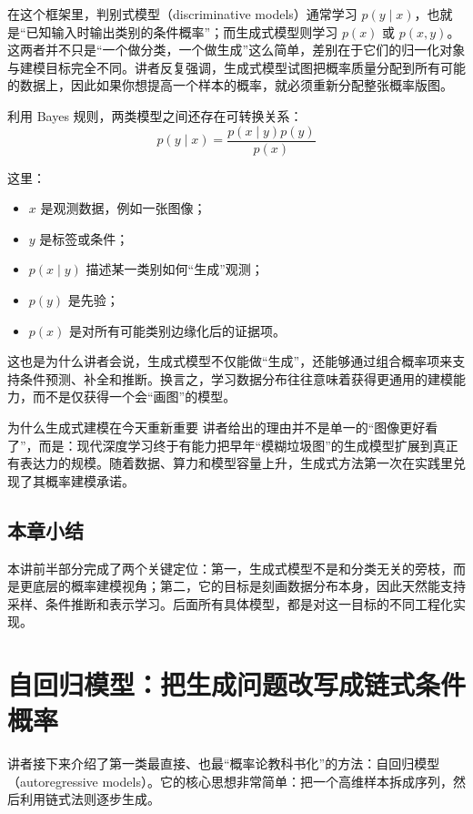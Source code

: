 \documentclass[a4paper]{article}
\begin{document}
    在这个框架里，判别式模型（discriminative models）通常学习 $p(y \mid x)$，也就是“已知输入时输出类别的条件概率”；而生成式模型则学习 $p(x)$ 或 $p(x, y)$。这两者并不只是“一个做分类，一个做生成”这么简单，差别在于它们的归一化对象与建模目标完全不同。讲者反复强调，生成式模型试图把概率质量分配到所有可能的数据上，因此如果你想提高一个样本的概率，就必须重新分配整张概率版图。

    利用 Bayes 规则，两类模型之间还存在可转换关系：
    \[
    p(y \mid x)=\frac{p(x \mid y)p(y)}{p(x)}
    \]

    这里：
    \begin{itemize}
    \item $x$ 是观测数据，例如一张图像；
    \item $y$ 是标签或条件；
    \item $p(x \mid y)$ 描述某一类别如何“生成”观测；
    \item $p(y)$ 是先验；
    \item $p(x)$ 是对所有可能类别边缘化后的证据项。
    \end{itemize}

    这也是为什么讲者会说，生成式模型不仅能做“生成”，还能够通过组合概率项来支持条件预测、补全和推断。换言之，学习数据分布往往意味着获得更通用的建模能力，而不是仅获得一个会“画图”的模型。

    \begin{importantbox}{为什么生成式建模在今天重新重要}
    讲者给出的理由并不是单一的“图像更好看了”，而是：现代深度学习终于有能力把早年“模糊垃圾图”的生成模型扩展到真正有表达力的规模。随着数据、算力和模型容量上升，生成式方法第一次在实践里兑现了其概率建模承诺。
    \end{importantbox}

    \subsection{本章小结}

    本讲前半部分完成了两个关键定位：第一，生成式模型不是和分类无关的旁枝，而是更底层的概率建模视角；第二，它的目标是刻画数据分布本身，因此天然能支持采样、条件推断和表示学习。后面所有具体模型，都是对这一目标的不同工程化实现。

    \section{自回归模型：把生成问题改写成链式条件概率}

    讲者接下来介绍了第一类最直接、也最“概率论教科书化”的方法：自回归模型（autoregressive models）。它的核心思想非常简单：把一个高维样本拆成序列，然后利用链式法则逐步生成。
\end{document}
